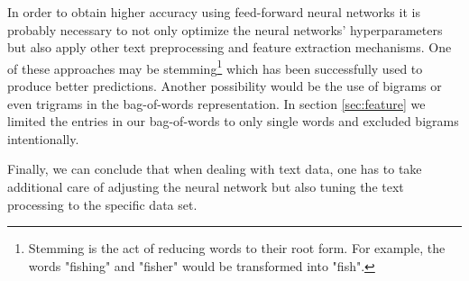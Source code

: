\documentclass[sigconf]{acmart}
\begin{document}
In order to obtain higher accuracy using feed-forward neural networks it is probably necessary to not only optimize the neural networks' hyperparameters but also apply other text preprocessing and feature extraction mechanisms. One of these approaches may be stemming\footnote{Stemming is the act of reducing words to their root form. For example, the words "fishing" and "fisher" would be transformed into "fish".} which has been successfully used to produce better predictions\cite{stemming}. Another possibility would be the use of bigrams or even trigrams in the bag-of-words representation. In section \ref{sec:feature} we limited the entries in our bag-of-words to only single words and excluded bigrams intentionally.

Finally, we can conclude that when dealing with text data, one has to take additional care of adjusting the neural network but also tuning the text processing to the specific data set.



\end{document}
